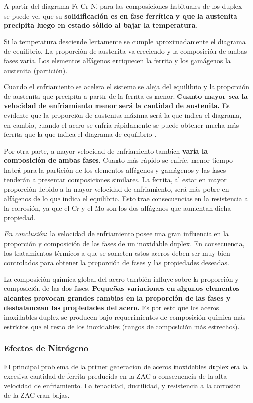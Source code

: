 A partir del diagrama Fe-Cr-Ni para las composiciones habituales de los duplex se puede ver que su \textbf{solidificación es en fase ferrítica y que la austenita precipita luego en estado sólido al bajar la temperatura.}

Si la temperatura desciende lentamente se cumple aproximadamente el diagrama de equilibrio. La proporción de austenita va creciendo y la composición de ambas fases varía. Los elementos alfágenos enriquecen la ferrita y los gamágenos la austenita (partición). 

Cuando el enfriamiento se acelera el sistema se aleja del equilibrio y la proporción de austenita que precipita a partir de la ferrita es menor. \textbf{Cuanto mayor sea la velocidad de enfriamiento menor será la cantidad de austenita.} Es evidente que la proporción de austenita máxima será la que indica el diagrama, en cambio, cuando el acero se enfría rápidamente se puede obtener mucha más ferrita que la que indica el diagrama de equilibrio .


Por otra parte, a mayor velocidad de enfriamiento también \textbf{varía la composición de ambas fases}. Cuanto más rápido se enfríe, menor tiempo habrá para la partición de los elementos alfágenos y gamágenos y las fases tenderán a presentar composiciones similares. La ferrita, al estar en mayor proporción debido a la mayor velocidad de enfriamiento, será más pobre en alfágenos de lo que indica el equilibrio. Esto trae consecuencias en la resistencia a la corrosión, ya que el Cr y el Mo son los dos alfágenos que aumentan dicha propiedad.

{\it En conclusión}: la velocidad de enfriamiento posee una gran influencia en la proporción y composición de las fases de un inoxidable duplex. En consecuencia, los tratamientos térmicos a que se someten estos aceros deben ser muy bien controlados para obtener la proporción de fases y las propiedades deseadas.

La composición química global del acero también influye sobre la proporción y composición de las dos fases. \textbf{Pequeñas variaciones en algunos elementos aleantes provocan grandes cambios en la proporción de las fases y desbalancean las propiedades del acero.} Es por esto que los aceros inoxidables duplex se producen bajo requerimientos de composición química más estrictos que el resto de los inoxidables (rangos de composición más estrechos).

\subsubsection{Efectos de Nitrógeno}
El principal problema de la primer generación de aceros inoxidables duplex era la excesiva cantidad de ferrita producida en la ZAC a consecuencia de la alta velocidad de enfriamiento. La tenacidad, ductilidad, y resistencia a la corrosión de la ZAC eran bajas.


